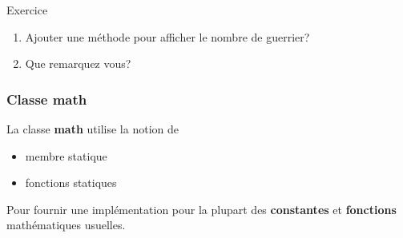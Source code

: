 \documentclass[letterpaper,10pt,english]{sphinxmanual}
\begin{document}
\begin{center}Exercice
\end{center}\begin{enumerate}
\item {} 
Ajouter une méthode pour afficher le nombre de guerrier?

\item {} 
Que remarquez vous?

\end{enumerate}


\subsubsection{Classe math}
\label{classes:classe-math}
La classe \textbf{math} utilise la notion de
\begin{itemize}
\item {} 
membre statique

\item {} 
fonctions statiques

\end{itemize}

Pour fournir une implémentation pour la plupart des  \textbf{constantes} et \textbf{fonctions} mathématiques usuelles.
\end{document}
